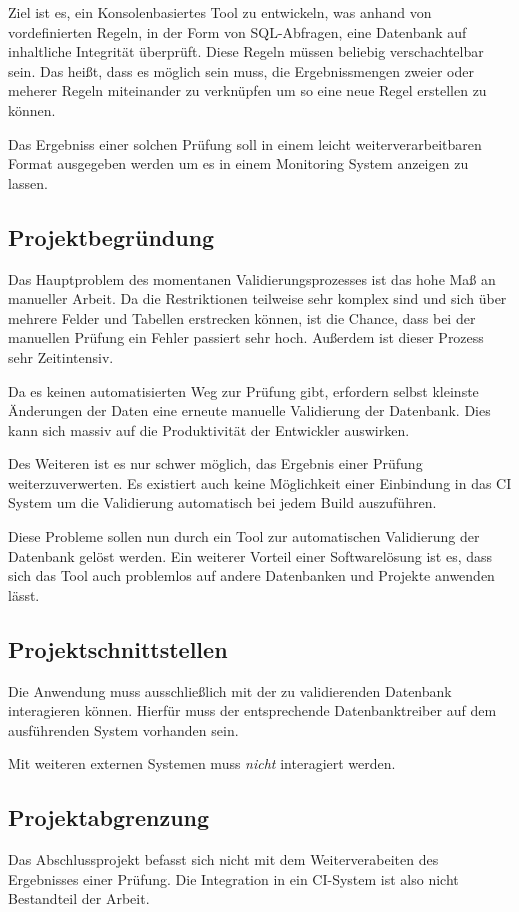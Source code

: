 Ziel ist es, ein Konsolenbasiertes Tool zu entwickeln, was anhand von vordefinierten Regeln, in der Form von \acs{SQL}-Abfragen, eine Datenbank auf inhaltliche Integrität überprüft. Diese Regeln müssen beliebig verschachtelbar sein. Das heißt, dass es möglich sein muss, die Ergebnissmengen zweier oder meherer Regeln miteinander zu verknüpfen um so eine neue Regel erstellen zu können.

Das Ergebniss einer solchen Prüfung soll in einem leicht weiterverarbeitbaren Format ausgegeben werden um es \bspw in einem Monitoring System anzeigen zu lassen.


\subsection{Projektbegründung} 
\label{sec:Projektbegruendung}
Das Hauptproblem des momentanen Validierungsprozesses ist das hohe Maß an manueller Arbeit. Da die Restriktionen teilweise sehr komplex sind und sich über mehrere Felder und Tabellen erstrecken können, ist die Chance, dass bei der manuellen Prüfung ein Fehler passiert sehr hoch. Außerdem ist dieser Prozess sehr Zeitintensiv.

Da es keinen automatisierten Weg zur Prüfung gibt, erfordern selbst kleinste Änderungen der Daten eine erneute manuelle Validierung der Datenbank. Dies kann sich massiv auf die Produktivität der Entwickler auswirken.

Des Weiteren ist es nur schwer möglich, das Ergebnis einer Prüfung weiterzuverwerten. Es existiert auch keine Möglichkeit einer Einbindung in das \ac{CI} System um die Validierung automatisch bei jedem Build auszuführen.

Diese Probleme sollen nun durch ein Tool zur automatischen Validierung der Datenbank gelöst werden. Ein weiterer Vorteil einer Softwarelösung ist es, dass sich das Tool auch problemlos auf andere Datenbanken und Projekte anwenden lässt.

\subsection{Projektschnittstellen} 
\label{sec:Projektschnittstellen}
Die Anwendung muss ausschließlich mit der zu validierenden Datenbank interagieren können. Hierfür muss der entsprechende Datenbanktreiber auf dem ausführenden System vorhanden sein.

Mit weiteren externen Systemen muss \emph{nicht} interagiert werden.

\subsection{Projektabgrenzung} 
\label{sec:Projektabgrenzung}
Das Abschlussprojekt befasst sich nicht mit dem Weiterverabeiten des Ergebnisses einer Prüfung. Die Integration in \zB ein \acs{CI}-System ist also nicht Bestandteil der Arbeit.
